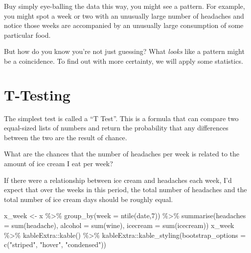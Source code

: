 \documentclass[
]{book}
\newenvironment{Shaded}{\begin{snugshade}}{\end{snugshade}}
\newcommand{\AttributeTok}[1]{\textcolor[rgb]{0.77,0.63,0.00}{#1}}
\newcommand{\DecValTok}[1]{\textcolor[rgb]{0.00,0.00,0.81}{#1}}
\newcommand{\FunctionTok}[1]{\textcolor[rgb]{0.00,0.00,0.00}{#1}}
\newcommand{\NormalTok}[1]{#1}
\newcommand{\OtherTok}[1]{\textcolor[rgb]{0.56,0.35,0.01}{#1}}
\newcommand{\SpecialCharTok}[1]{\textcolor[rgb]{0.00,0.00,0.00}{#1}}
\newcommand{\StringTok}[1]{\textcolor[rgb]{0.31,0.60,0.02}{#1}}
\begin{document}
Buy simply eye-balling the data this way, you might see a pattern. For example, you might spot a week or two with an unusually large number of headaches and notice those weeks are accompanied by an unusually large consumption of some particular food.

But how do you know you're not just guessing? What \emph{looks} like a pattern might be a coincidence. To find out with more certainty, we will apply some statistics.

\hypertarget{t-testing}{%
\section{T-Testing}\label{t-testing}}

The simplest test is called a ``T Test''. This is a formula that can compare two equal-sized lists of numbers and return the probability that any differences between the two are the result of chance.

What are the chances that the number of headaches per week is related to the amount of ice cream I eat per week?

If there were a relationship between ice cream and headaches each week, I'd expect that over the weeks in this period, the total number of headaches and the total number of ice cream days should be roughly equal.

\begin{Shaded}
\begin{Highlighting}[]
\NormalTok{x\_week }\OtherTok{\textless{}{-}}\NormalTok{ x }\SpecialCharTok{\%\textgreater{}\%} \FunctionTok{group\_by}\NormalTok{(}\AttributeTok{week =} \FunctionTok{ntile}\NormalTok{(date,}\DecValTok{7}\NormalTok{)) }\SpecialCharTok{\%\textgreater{}\%} 
  \FunctionTok{summarise}\NormalTok{(}\AttributeTok{headaches =} \FunctionTok{sum}\NormalTok{(headache),}
            \AttributeTok{alcohol =} \FunctionTok{sum}\NormalTok{(wine),}
            \AttributeTok{icecream =} \FunctionTok{sum}\NormalTok{(icecream)) }
\NormalTok{x\_week }\SpecialCharTok{\%\textgreater{}\%}\NormalTok{ kableExtra}\SpecialCharTok{::}\FunctionTok{kable}\NormalTok{() }\SpecialCharTok{\%\textgreater{}\%}
\NormalTok{  kableExtra}\SpecialCharTok{::}\FunctionTok{kable\_styling}\NormalTok{(}\AttributeTok{bootstrap\_options =} \FunctionTok{c}\NormalTok{(}\StringTok{"striped"}\NormalTok{, }\StringTok{"hover"}\NormalTok{, }\StringTok{"condensed"}\NormalTok{)) }
\end{Highlighting}
\end{Shaded}
\end{document}
